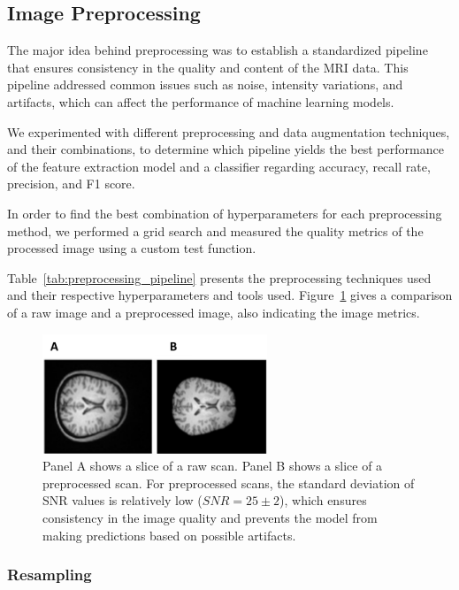 %
\subsection{Image Preprocessing}

The major idea behind preprocessing was to establish a standardized pipeline that ensures consistency in the quality and content of the MRI data. This pipeline addressed common issues such as noise, intensity variations, and artifacts, which can affect the performance of machine learning models.

We experimented with different preprocessing and data augmentation techniques, and their combinations, to determine which pipeline yields the best performance of the feature extraction model and a classifier regarding accuracy, recall rate, precision, and F1 score.

In order to find the best combination of hyperparameters for each preprocessing method, we performed a grid search and measured the quality metrics of the processed image using a custom test function.

Table~\ref{tab:preprocessing_pipeline} presents the preprocessing techniques used and their respective hyperparameters and tools used. Figure~\ref{fig:slice_comparison} gives a comparison of a raw image and a preprocessed image, also indicating the image metrics.
%
\begin{figure}[h]
    \centering
    \includegraphics[width=0.6\textwidth]{./figs/slice_comparison.png} %
    \caption{Panel A shows a slice of a raw scan. Panel B shows a slice of a preprocessed scan. For preprocessed scans, the standard deviation of SNR values is relatively low (\mbox{$SNR= 25 \pm 2$}), which ensures consistency in the image quality and prevents the model from making predictions based on possible artifacts.}\label{fig:slice_comparison}
\end{figure}

\subsubsection{Resampling}

